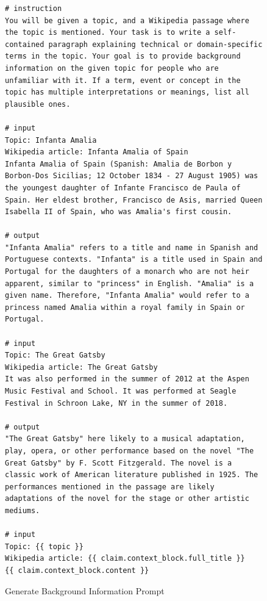 \begin{figure}[htb]
\begin{lstlisting}
# instruction
You will be given a topic, and a Wikipedia passage where the topic is mentioned. Your task is to write a self-contained paragraph explaining technical or domain-specific terms in the topic. Your goal is to provide background information on the given topic for people who are unfamiliar with it. If a term, event or concept in the topic has multiple interpretations or meanings, list all plausible ones.

# input
Topic: Infanta Amalia
Wikipedia article: Infanta Amalia of Spain
Infanta Amalia of Spain (Spanish: Amalia de Borbon y Borbon-Dos Sicilias; 12 October 1834 - 27 August 1905) was the youngest daughter of Infante Francisco de Paula of Spain. Her eldest brother, Francisco de Asis, married Queen Isabella II of Spain, who was Amalia's first cousin.

# output
"Infanta Amalia" refers to a title and name in Spanish and Portuguese contexts. "Infanta" is a title used in Spain and Portugal for the daughters of a monarch who are not heir apparent, similar to "princess" in English. "Amalia" is a given name. Therefore, "Infanta Amalia" would refer to a princess named Amalia within a royal family in Spain or Portugal.

# input
Topic: The Great Gatsby
Wikipedia article: The Great Gatsby
It was also performed in the summer of 2012 at the Aspen Music Festival and School. It was performed at Seagle Festival in Schroon Lake, NY in the summer of 2018.

# output
"The Great Gatsby" here likely to a musical adaptation, play, opera, or other performance based on the novel "The Great Gatsby" by F. Scott Fitzgerald. The novel is a classic work of American literature published in 1925. The performances mentioned in the passage are likely adaptations of the novel for the stage or other artistic mediums.

# input
Topic: {{ topic }}
Wikipedia article: {{ claim.context_block.full_title }}
{{ claim.context_block.content }}
\end{lstlisting}

\caption{Generate Background Information Prompt}
\label{lst:generate_background_info}
\end{figure}




